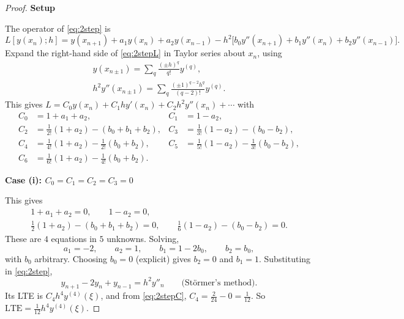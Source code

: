 \documentclass[11pt,a4paper]{article}
\numberwithin{equation}{section}
\theoremstyle{spacedplain}
\theoremstyle{spaceddefinition}
\theoremstyle{spacedremark}
\newcommand{\step}[1]{\par\addvspace{0.6em}\noindent\textbf{#1}\par\nobreak}
\begin{document}
\begin{proof}\leavevmode
\step{Setup}
The operator of \eqref{eq:2step} is
\begin{equation}\label{eq:2stepL}
  L[y(x_n);h]
  =y(x_{n+1})+a_1y(x_n)+a_2y(x_{n-1})
   -h^2\bigl[b_0y''(x_{n+1})+b_1y''(x_n)+b_2y''(x_{n-1})\bigr].
\end{equation}
Expand the right-hand side of \eqref{eq:2stepL} in Taylor series about
\(x_n\), using
\[
\begin{gathered}
  y(x_{n\pm1})=\sum_q\frac{(\pm h)^q}{q!}y^{(q)},
  \\
  h^2y''(x_{n\pm1})=\sum_q\frac{(\pm1)^{q-2}h^q}{(q-2)!}y^{(q)}.
\end{gathered}
\]
This gives
\(L=C_0y(x_n)+C_1hy'(x_n)+C_2h^2y''(x_n)+\cdots\) with
\begin{equation}\label{eq:2stepC}
\begin{aligned}
  C_0&=1+a_1+a_2, & C_1&=1-a_2,\\
  C_2&=\tfrac1{2!}(1+a_2)-(b_0+b_1+b_2), & C_3&=\tfrac1{3!}(1-a_2)-(b_0-b_2),\\
  C_4&=\tfrac1{4!}(1+a_2)-\tfrac1{2!}(b_0+b_2), & C_5&=\tfrac1{5!}(1-a_2)-\tfrac1{3!}(b_0-b_2),\\
  C_6&=\tfrac1{6!}(1+a_2)-\tfrac1{4!}(b_0+b_2).
\end{aligned}
\end{equation}

\step{Case (i): \(C_0=C_1=C_2=C_3=0\)}
This gives
\begin{equation}\label{eq:2step4}
\begin{gathered}
  1+a_1+a_2=0,\qquad 1-a_2=0,\\
  \tfrac12(1+a_2)-(b_0+b_1+b_2)=0,\qquad
  \tfrac16(1-a_2)-(b_0-b_2)=0.
\end{gathered}
\end{equation}
These are \(4\) equations in \(5\) unknowns.  Solving,
\[
  a_1=-2,\qquad a_2=1,\qquad b_1=1-2b_0,\qquad b_2=b_0,
\]
with \(b_0\) arbitrary.  Choosing \(b_0=0\) (explicit) gives \(b_2=0\)
and \(b_1=1\).  Substituting in \eqref{eq:2step},
\[
  \boxed{y_{n+1}-2y_n+y_{n-1}=h^2y''_n}
  \qquad\text{(Störmer's method).}
\]
Its LTE is \(C_4h^4y^{(4)}(\xi)\), and from \eqref{eq:2stepC},
\(C_4=\frac2{24}-0=\frac1{12}\).  So
\(\text{LTE}=\frac1{12}h^4y^{(4)}(\xi)\).


\end{proof}
\end{document}
